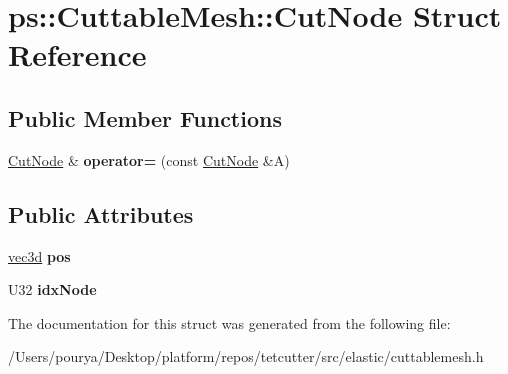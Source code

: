 \hypertarget{structps_1_1CuttableMesh_1_1CutNode}{}\section{ps\+:\+:Cuttable\+Mesh\+:\+:Cut\+Node Struct Reference}
\label{structps_1_1CuttableMesh_1_1CutNode}
\subsection*{Public Member Functions}
\begin{DoxyCompactItemize}
\item 
\hypertarget{structps_1_1CuttableMesh_1_1CutNode_a85fdce69e9719cb6e46215e83485b5d9}{}\hyperlink{structps_1_1CuttableMesh_1_1CutNode}{Cut\+Node} \& {\bfseries operator=} (const \hyperlink{structps_1_1CuttableMesh_1_1CutNode}{Cut\+Node} \&A)\label{structps_1_1CuttableMesh_1_1CutNode_a85fdce69e9719cb6e46215e83485b5d9}

\end{DoxyCompactItemize}
\subsection*{Public Attributes}
\begin{DoxyCompactItemize}
\item 
\hypertarget{structps_1_1CuttableMesh_1_1CutNode_a46d573d4a1afed6a046dff43919c3e9d}{}\hyperlink{classps_1_1base_1_1Vec3}{vec3d} {\bfseries pos}\label{structps_1_1CuttableMesh_1_1CutNode_a46d573d4a1afed6a046dff43919c3e9d}

\item 
\hypertarget{structps_1_1CuttableMesh_1_1CutNode_ad75ebee6a9c163f00d990cc996fb2e95}{}U32 {\bfseries idx\+Node}\label{structps_1_1CuttableMesh_1_1CutNode_ad75ebee6a9c163f00d990cc996fb2e95}

\end{DoxyCompactItemize}


The documentation for this struct was generated from the following file\+:\begin{DoxyCompactItemize}
\item 
/\+Users/pourya/\+Desktop/platform/repos/tetcutter/src/elastic/cuttablemesh.\+h\end{DoxyCompactItemize}
